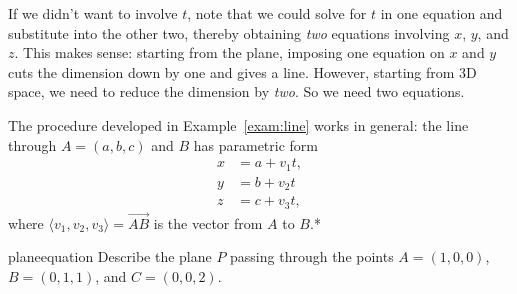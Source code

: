 \documentclass{watsonbook}
\begin{document}
If we didn't want to involve $t$, note that we could solve for $t$ in
one equation and substitute into the other two, thereby obtaining
\textit{two} equations involving $x$, $y$, and $z$. This makes sense:
starting from the plane, imposing one equation on $x$ and $y$ cuts the
dimension down by one and gives a line. However, starting from 3D
space, we need to reduce the dimension by \textit{two}. So we need
two equations.

The procedure developed in Example~\ref{exam:line} works in general:
the line through $A = (a,b,c)$ and $B$ has parametric form
\begin{align*}
x &= a + v_1 t, \\
y &= b + v_2 t \\ 
z &= c + v_3 t, 
\end{align*}
where $\langle v_1, v_2, v_3 \rangle = \overrightarrow{AB}$ is the vector from $A$ to
$B$.* 

\begin{example}{}{planeequation}
  Describe the plane $P$ passing through the points $A = (1,0,0)$, $B =
  (0,1,1)$, and $C = (0,0,2)$.
\end{example}
\end{document}
